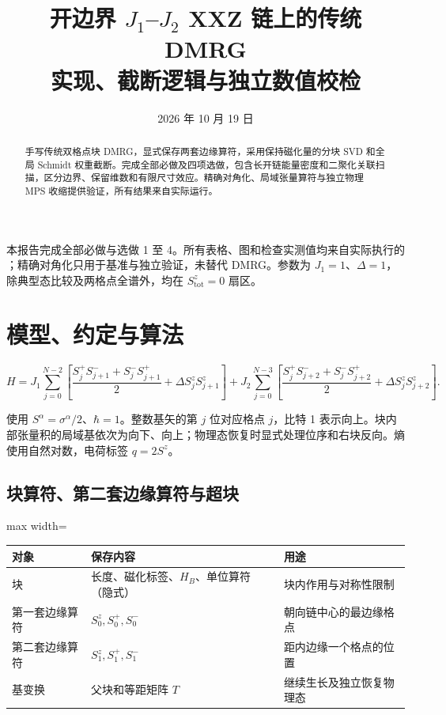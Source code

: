 \documentclass[zihao=5,a4paper]{ctexart}
\title{开边界 $J_1$--$J_2$ XXZ 链上的传统 DMRG\\\large 实现、截断逻辑与独立数值校检}
\author{}
\date{2026 年 10 月 19 日}
\begin{document}
\maketitle
\begin{abstract}
手写传统双格点块 DMRG，显式保存两套边缘算符，采用保持磁化量的分块 SVD 和全局 Schmidt 权重截断。完成全部必做及四项选做，包含长开链能量密度和二聚化关联扫描，区分边界、保留维数和有限尺寸效应。精确对角化、局域张量算符与独立物理 MPS 收缩提供验证，所有结果来自实际运行。
\end{abstract}
\setcounter{tocdepth}{1}
\tableofcontents
\clearpage
本报告完成全部必做与选做 1 至 4。所有表格、图和检查实测值均来自实际执行的 ；精确对角化只用于基准与独立验证，未替代 DMRG。参数为 $J_1=1$、$\Delta=1$，除典型态比较及两格点全谱外，均在 $S^z_{\mathrm{tot}}=0$ 扇区。


\section{模型、约定与算法}

\[
H=J_1\sum_{j=0}^{N-2}\left[\frac{S_j^+S_{j+1}^-+S_j^-S_{j+1}^+}{2}+\Delta S_j^zS_{j+1}^z\right]+J_2\sum_{j=0}^{N-3}\left[\frac{S_j^+S_{j+2}^-+S_j^-S_{j+2}^+}{2}+\Delta S_j^zS_{j+2}^z\right].
\]

使用 $S^\alpha=\sigma^\alpha/2$、$\hbar=1$。整数基矢的第 $j$ 位对应格点 $j$，比特 1 表示向上。块内部张量积的局域基依次为向下、向上；物理态恢复时显式处理位序和右块反向。熵使用自然对数，电荷标签 $q=2S^z$。


\subsection{\texorpdfstring{块算符、第二套边缘算符与超块}{块算符、第二套边缘算符与超块}}

\begin{center}
\small
\begin{adjustbox}{max width=\linewidth}
\begin{tabular}{lll}
\toprule
对象 & 保存内容 & 用途 \\
\midrule
块 & 长度、磁化标签、$H_B$、单位算符（隐式） & 块内作用与对称性限制 \\
第一套边缘算符 & $S^z_0,S^+_0,S^-_0$ & 朝向链中心的最边缘格点 \\
第二套边缘算符 & $S^z_1,S^+_1,S^-_1$ & 距内边缘一个格点的位置 \\
基变换 & 父块和等距矩阵 $T$ & 继续生长及独立恢复物理态 \\
\bottomrule
\end{tabular}
\end{adjustbox}
\end{center}
\end{document}
